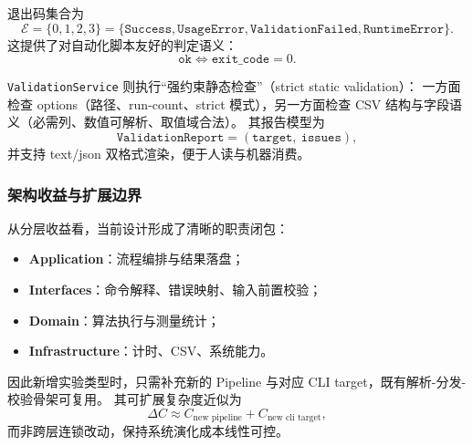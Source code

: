 退出码集合为
\begin{equation}
\mathcal{E}=\{0,1,2,3\}=
\{\texttt{Success},\texttt{UsageError},\texttt{ValidationFailed},\texttt{RuntimeError}\}.
\end{equation}
这提供了对自动化脚本友好的判定语义：
\begin{equation}
\texttt{ok} \iff \texttt{exit\_code}=0.
\end{equation}

\texttt{ValidationService} 则执行“强约束静态检查”（strict static validation）：
一方面检查 options（路径、run-count、strict 模式），另一方面检查 CSV 结构与字段语义（必需列、数值可解析、取值域合法）。
其报告模型为
\begin{equation}
\texttt{ValidationReport}=(\texttt{target},\ \texttt{issues}),
\end{equation}
并支持 text/json 双格式渲染，便于人读与机器消费。

\subsubsection{架构收益与扩展边界}

从分层收益看，当前设计形成了清晰的职责闭包：
\begin{itemize}
    \item \textbf{Application}：流程编排与结果落盘；
    \item \textbf{Interfaces}：命令解释、错误映射、输入前置校验；
    \item \textbf{Domain}：算法执行与测量统计；
    \item \textbf{Infrastructure}：计时、CSV、系统能力。
\end{itemize}

因此新增实验类型时，只需补充新的 Pipeline 与对应 CLI target，既有解析-分发-校验骨架可复用。
其可扩展复杂度近似为
\begin{equation}
\Delta C \approx C_{\text{new pipeline}} + C_{\text{new cli target}},
\end{equation}
而非跨层连锁改动，保持系统演化成本线性可控。
